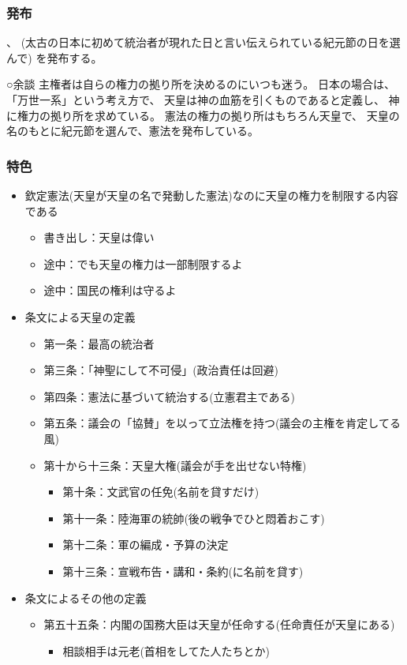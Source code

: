 \documentclass[12pt,fleqn]{ltjsarticle}
\begin{document}
\subsubsection{発布}
、
(太古の日本に初めて統治者が現れた日と言い伝えられている紀元節の日を選んで)
を発布する。

○余談
主権者は自らの権力の拠り所を決めるのにいつも迷う。
日本の場合は、「万世一系」という考え方で、
天皇は神の血筋を引くものであると定義し、
神に権力の拠り所を求めている。
憲法の権力の拠り所はもちろん天皇で、
天皇の名のもとに紀元節を選んで、憲法を発布している。

\subsubsection{特色}
\begin{itemize}
\item 欽定憲法(天皇が天皇の名で発動した憲法)なのに天皇の権力を制限する内容である
\begin{itemize}
\item 書き出し：天皇は偉い
\item 途中：でも天皇の権力は一部制限するよ
\item 途中：国民の権利は守るよ
\end{itemize}

\item 条文による天皇の定義
\begin{itemize}
\item 第一条：最高の統治者
\item 第三条：「神聖にして不可侵」(政治責任は回避)
\item 第四条：憲法に基づいて統治する(立憲君主である)
\item 第五条：議会の「協賛」を以って立法権を持つ(議会の主権を肯定してる風)
\item 第十から十三条：天皇大権(議会が手を出せない特権)
\begin{itemize}
\item 第十条：文武官の任免(名前を貸すだけ)
\item 第十一条：陸海軍の統帥(後の戦争でひと悶着おこす)
\item 第十二条：軍の編成・予算の決定
\item 第十三条：宣戦布告・講和・条約(に名前を貸す)
\end{itemize}
\end{itemize}

\item 条文によるその他の定義
\begin{itemize}
\item 第五十五条：内閣の国務大臣は天皇が任命する(任命責任が天皇にある)
\begin{itemize}
\item 相談相手は元老(首相をしてた人たちとか)


\end{itemize}
\end{itemize}
\end{itemize}
\end{document}
